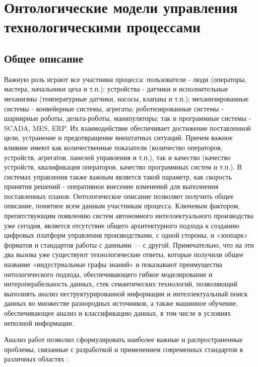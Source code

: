 \chapter{Онтологические модели управления технологическими процессами}

\section{Общее описание}

Важную роль играют все участники процесса: пользователи - люди (операторы, мастера, начальники цеха и т.п.); устройства - датчики и исполнительные механизмы (температурные датчики, насосы, клапана и т.п.); механизированные системы - конвейерные системы, агрегаты; роботизированные системы - шарнирные роботы, дельта-роботы, манипуляторы; так и программные системы - SCADA, MES, ERP. Их взаимодействие обеспечивает достижение поставленной цели, устранение и предотвращение внештатных ситуаций. Причем важное влияние имеют как количественные показатели (количество операторов, устройств, агрегатов, панелей управления и т.п.), так и качество (качество устройств, квалификация операторов, качество программных систем и т.п.). В системах управления также важным является такой параметр, как скорость принятия решений - оперативное внесение изменений для выполнения поставленных планов. Онтологическое описание позволяет получить общее описание, понятное всем данным участникам процесса.
Ключевым фактором, препятствующим появлению систем автономного интеллектуального производства уже сегодня, является отсутствие общего архитектурного подхода к созданию цифровых платформ управления производствами, с одной стороны, и «зоопарк» форматов и стандартов работы с данными — с другой. Примечательно, что на эти два вызова уже существуют технологические ответы, которые получили общее название «индустриальные графы знаний» \cite{Муромцев2019} и показывают преимущества онтологического подхода, обеспечивающего гибкое моделирование и интероперабельность данных, стек семантических технологий, позволяющий выполнять анализ неструктурированной информации и интеллектуальный поиск данных во множестве разнородных источников, а также машинное обучение, обеспечивающее анализ и классификацию данных, в том числе в условиях неполной информации.

Анализ работ позволил сформулировать наиболее важные и распространенные проблемы, связанные с разработкой и применением современных стандартов в различных областях \cite{Серенков2004, Углев2012}:

